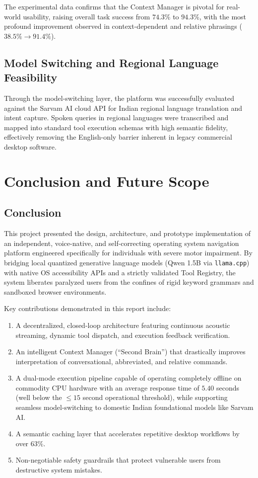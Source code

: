 \documentclass[12pt,a4paper]{report}
\begin{document}
The experimental data confirms that the Context Manager is pivotal for real-world usability, raising overall task success from $74.3\%$ to $94.3\%$, with the most profound improvement observed in context-dependent and relative phrasings ($38.5\% \rightarrow 91.4\%$).

\section{Model Switching and Regional Language Feasibility}
Through the model-switching layer, the platform was successfully evaluated against the Sarvam AI cloud API for Indian regional language translation and intent capture. Spoken queries in regional languages were transcribed and mapped into standard tool execution schemas with high semantic fidelity, effectively removing the English-only barrier inherent in legacy commercial desktop software.


\chapter{Conclusion and Future Scope}
\label{chap:conclusion}

\section{Conclusion}
This project presented the design, architecture, and prototype implementation of an independent, voice-native, and self-correcting operating system navigation platform engineered specifically for individuals with severe motor impairment. By bridging local quantized generative language models (Qwen 1.5B via \texttt{llama.cpp}) with native OS accessibility APIs and a strictly validated Tool Registry, the system liberates paralyzed users from the confines of rigid keyword grammars and sandboxed browser environments.

Key contributions demonstrated in this report include:
\begin{enumerate}
    \item A decentralized, closed-loop architecture featuring continuous acoustic streaming, dynamic tool dispatch, and execution feedback verification.
    \item An intelligent Context Manager (``Second Brain'') that drastically improves interpretation of conversational, abbreviated, and relative commands.
    \item A dual-mode execution pipeline capable of operating completely offline on commodity CPU hardware with an average response time of $5.40$ seconds (well below the $\le 15$ second operational threshold), while supporting seamless model-switching to domestic Indian foundational models like Sarvam AI.
    \item A semantic caching layer that accelerates repetitive desktop workflows by over $63\%$.
    \item Non-negotiable safety guardrails that protect vulnerable users from destructive system mistakes.
\end{enumerate}
\end{document}
